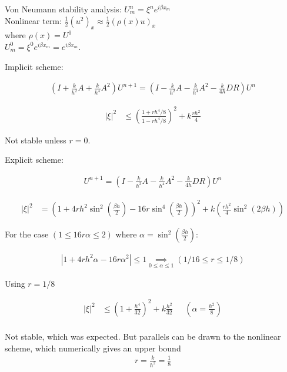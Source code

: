 

\LARGE
Von Neumann stability analysis: $U_m^n = \xi^n e^{i \beta x_m}$ \\
\Large
Nonlinear term: $\frac{1}{2}(u^2)_x \approx \frac{1}{2}(\rho(x)u)_x$ \\
where $\rho(x) = U^0$ \\

$U_{m}^0 = \xi^0 e^{i\beta x_m} = e^{i\beta x_m}$.

\huge
Implicit scheme:

\Large
\begin{align*}
\left( I + \frac{k}{h^2}A + \frac{k}{h^4}A^2\right) U^{n+1} = \left( I - \frac{k}{h^2}A - \frac{k}{h^4}A^2 - \frac{k}{4h} DR \right)U^{n}
\end{align*}


\begin{align*}
|\xi |^2 &\le \left(\frac{1+rh^4/8}{1-rh^4/8}\right)^2 + k\frac{rh^2}{4}
\end{align*}

Not stable unless $r=0$.


\huge

Explicit scheme:

\Large
\begin{align*}
U^{n+1} = \left(I - \frac{k}{h^2}A - \frac{k}{h^4}A^2 - \frac{k}{4h} DR\right)U^{n} 
\end{align*}




\begin{align*}
|\xi |^2 &=  \left(1+4rh^2\sin^2\left(\frac{\beta h}{2}\right)-16r\sin^4\left(\frac{\beta h}{2}\right)\right)^2 + k\left(\frac{rh^2}{4}\sin^2(2\beta h)\right)
\end{align*}

For the case $(1 \le 16r\alpha \le 2)$ where $\alpha = \sin^2(\frac{\beta h}{2})$:

\begin{align*}
 \left| 1+4rh^2\alpha -16r\alpha^2\right| \le 1 \underset{0\le \alpha\le 1}{\implies} \left(1/16 \le r \le 1/8 \right)
\end{align*} 

Using $r = 1/8$ 

\begin{align*}
|\xi |^2 &\le \left(1 + \frac{h^4}{32}\right)^2 + k\frac{h^2}{32} &\text{ } ( \alpha = \frac{h^2}{8} )\\
\end{align*}

Not stable, which was expected. But parallels can be drawn to the nonlinear scheme, which numerically gives an upper bound\\
\begin{align*}
r = \frac{k}{h^2} = \frac{1}{8}
\end{align*} 



